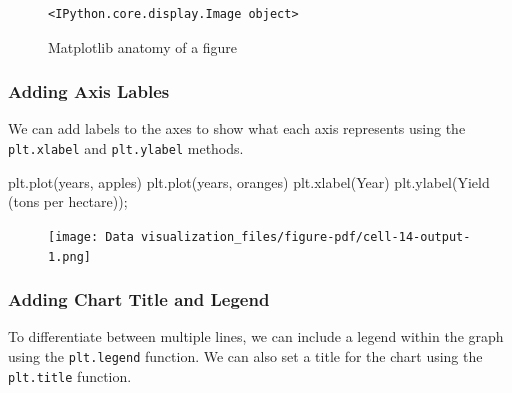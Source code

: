 \documentclass[
  letterpaper,
  DIV=11,
  numbers=noendperiod]{scrreprt}
\newenvironment{Shaded}{\begin{snugshade}}{\end{snugshade}}
\newcommand{\NormalTok}[1]{\textcolor[rgb]{0.00,0.23,0.31}{#1}}
\newcommand{\OperatorTok}[1]{\textcolor[rgb]{0.37,0.37,0.37}{#1}}
\newcommand{\StringTok}[1]{\textcolor[rgb]{0.13,0.47,0.30}{#1}}
\begin{document}
\begin{figure}

{\centering 

\begin{verbatim}
<IPython.core.display.Image object>
\end{verbatim}

}

\caption{\label{fig-anatomy}Matplotlib anatomy of a figure}

\end{figure}

\hypertarget{adding-axis-lables}{%
\subsubsection{Adding Axis Lables}\label{adding-axis-lables}}

We can add labels to the axes to show what each axis represents using
the \texttt{plt.xlabel} and \texttt{plt.ylabel} methods.

\begin{Shaded}
\begin{Highlighting}[]
\NormalTok{plt.plot(years, apples)}
\NormalTok{plt.plot(years, oranges)}
\NormalTok{plt.xlabel(}\StringTok{\textquotesingle{}Year\textquotesingle{}}\NormalTok{)}
\NormalTok{plt.ylabel(}\StringTok{\textquotesingle{}Yield (tons per hectare)\textquotesingle{}}\NormalTok{)}\OperatorTok{;}
\end{Highlighting}
\end{Shaded}

\begin{figure}[H]

{\centering \texttt{[image: Data visualization\_files/figure-pdf/cell-14-output-1.png]}

}

\end{figure}

\hypertarget{adding-chart-title-and-legend}{%
\subsubsection{Adding Chart Title and
Legend}\label{adding-chart-title-and-legend}}

To differentiate between multiple lines, we can include a legend within
the graph using the \texttt{plt.legend} function. We can also set a
title for the chart using the \texttt{plt.title} function.
\end{document}

